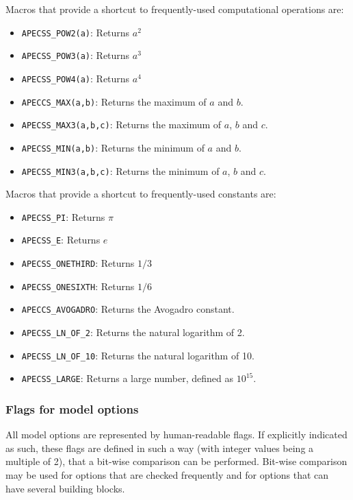 Macros that provide a shortcut to frequently-used computational operations are:\vspace{-1em}
\begin{itemize}[noitemsep]
  \item {\tt APECSS\_POW2(a)}: Returns $a^2$
  \item {\tt APECSS\_POW3(a)}: Returns $a^3$
  \item {\tt APECSS\_POW4(a)}: Returns $a^4$
  \item {\tt APECCS\_MAX(a,b)}: Returns the maximum of $a$ and $b$.
  \item {\tt APECSS\_MAX3(a,b,c)}: Returns the maximum of $a$, $b$ and $c$.
  \item {\tt APECSS\_MIN(a,b)}: Returns the minimum of $a$ and $b$.
  \item {\tt APECSS\_MIN3(a,b,c)}: Returns the minimum of $a$, $b$ and $c$.
\end{itemize}

Macros that provide a shortcut to frequently-used constants are:\vspace{-1em}
\begin{itemize}[noitemsep]
  \item {\tt APECSS\_PI}: Returns $\pi$
  \item {\tt APECSS\_E}: Returns $e$
  \item {\tt APECSS\_ONETHIRD}: Returns $1/3$
  \item {\tt APECSS\_ONESIXTH}: Returns $1/6$
  \item {\tt APECCS\_AVOGADRO}: Returns the Avogadro constant.
  \item {\tt APECSS\_LN\_OF\_2}: Returns the natural logarithm of 2.
  \item {\tt APECSS\_LN\_OF\_10}: Returns the natural logarithm of 10.
  \item {\tt APECSS\_LARGE}: Returns a large number, defined as $10^{15}$.
\end{itemize}

\subsubsection{Flags for model options}

All model options are represented by human-readable flags. If explicitly indicated as such, these flags are defined in such a way (with integer values being a multiple of 2), that a bit-wise comparison can be performed. Bit-wise comparison may be used for options that are checked frequently and for options that can have several building blocks.

